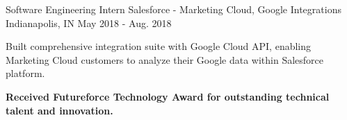 \begin{cventries}
  \cventry
    {Software Engineering Intern}
    {Salesforce - Marketing Cloud, Google Integrations}
    {Indianapolis, IN}
    {May 2018 - Aug. 2018}
    {
      \begin{cvitems}
        \item {Built comprehensive integration suite with Google Cloud API, enabling Marketing Cloud customers to analyze their Google data within Salesforce platform.}
        \item {\textbf{Received Futureforce Technology Award for outstanding technical talent and innovation.}}
      \end{cvitems}
    }
\end{cventries}